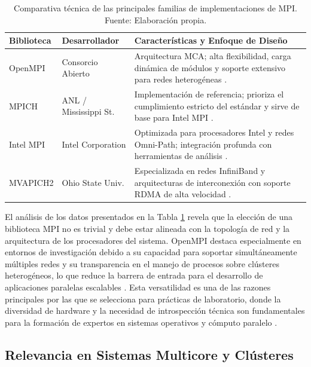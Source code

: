 \begin{table}[H]
    \centering
    \caption{Comparativa técnica de las principales familias de implementaciones de MPI. Fuente: Elaboración propia.}
    \label{tab:mpi_comparison}
    \begin{tabular}{|l|l|p{7cm}|}
    \hline
    \textbf{Biblioteca} & \textbf{Desarrollador} & \textbf{Características y Enfoque de Diseño} \\ \hline
    OpenMPI & Consorcio Abierto & Arquitectura MCA; alta flexibilidad, carga dinámica de módulos y soporte extensivo para redes heterogéneas \cite{ref7_cristian_Squyres2004}. \\ \hline
    MPICH & ANL / Mississippi St. & Implementación de referencia; prioriza el cumplimiento estricto del estándar y sirve de base para Intel MPI \cite{ref5_cristian_Graham2006}. \\ \hline
    Intel MPI & Intel Corporation & Optimizada para procesadores Intel y redes Omni-Path; integración profunda con herramientas de análisis \cite{ref15_cristian_CARC_MPI_Guide}. \\ \hline
    MVAPICH2 & Ohio State Univ. & Especializada en redes InfiniBand y arquitecturas de interconexión con soporte RDMA de alta velocidad \cite{ref15_cristian_CARC_MPI_Guide}. \\ \hline
    \end{tabular}
\end{table}

El análisis de los datos presentados en la Tabla \ref{tab:mpi_comparison} revela que la elección de una biblioteca MPI no es trivial y debe estar alineada con la topología de red y la arquitectura de los procesadores del sistema. OpenMPI destaca especialmente en entornos de investigación debido a su capacidad para soportar simultáneamente múltiples redes y su transparencia en el manejo de procesos sobre clústeres heterogéneos, lo que reduce la barrera de entrada para el desarrollo de aplicaciones paralelas escalables \cite{ref7_cristian_Squyres2004, ref5_cristian_Graham2006}. Esta versatilidad es una de las razones principales por las que se selecciona para prácticas de laboratorio, donde la diversidad de hardware y la necesidad de introspección técnica son fundamentales para la formación de expertos en sistemas operativos y cómputo paralelo \cite{ref11_cristian_OpenMPI_FAQ}.

\subsection{Relevancia en Sistemas Multicore y Clústeres}

